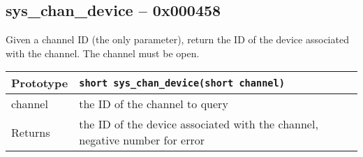 \subsection*{sys\_chan\_device -- 0x000458}
Given a channel ID (the only parameter), return the ID of the device associated with the channel. The channel must be open.

\bigskip

\begin{tabular}{|l||l|} \hline
Prototype & \lstinline!short sys_chan_device(short channel)! \\ \hline
channel & the ID of the channel to query \\ \hline
Returns & the ID of the device associated with the channel, negative number for error \\ \hline
\end{tabular}

